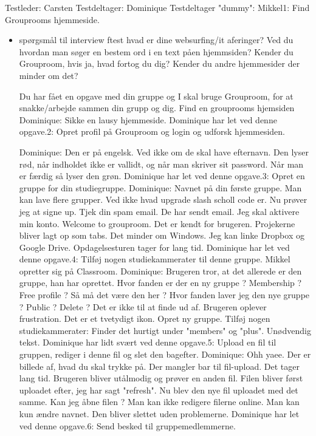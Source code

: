 \documentclass[12pt]{article}
\begin{document}
Testleder: Carsten
Testdeltager: Dominique
Testdeltager "dummy": Mikkel1: Find Grouprooms hjemmeside.

\begin{itemize} 
\item {sp\o rgsm\aa l til interview f\or test}
hvad er dine websurfing/it aferinger?
Ved du hvordan man s\o ger en bestem ord i en text p\aa  en hjemmsiden?
Kender du Grouproom, hvis ja, hvad fortog du dig?
Kender du andre hjemmesider der minder om det?
 

Du har f\aa et en opgave med din gruppe og I skal bruge Grouproom, for at snakke/arbejde sammen din grupp og dig. Find en grouprooms hjemsiden
Dominique: Sikke en lausy hjemmeside.
Dominique har let ved denne opgave.2: Opret profil på Grouproom og login og udforsk hjemmesiden.

Dominique: Den er på engelsk. Ved ikke om de skal have efternavn. Den lyser rød, når indholdet ikke er vallidt, og når man skriver sit password. Når man er færdig så lyser den grøn.
Dominique har let ved denne opgave.3: Opret en gruppe for din studiegruppe.
Dominique: Navnet på din første gruppe. Man kan lave flere grupper. Ved ikke hvad upgrade slash scholl code er.
Nu prøver jeg at signe up.
Tjek din spam email. De har sendt email.
Jeg skal aktivere min konto.
Welcome to grouproom.
Det er kendt for brugeren. Projekerne bliver lagt op som tabs. Det minder om Windows.
Jeg kan linke Dropbox og Google Drive.
Opdagelsesturen tager for lang tid.
Dominique har let ved denne opgave.4: Tilføj nogen studiekammerater til denne gruppe.
Mikkel opretter sig på Classroom.
Dominique: Brugeren tror, at det allerede er den gruppe, han har oprettet.
Hvor fanden er der en ny gruppe ?
Membership ? Free profile ? Så må det være den her ?
Hvor fanden laver jeg den nye gruppe ? Public ? Delete ?
Det er ikke til at finde ud af. Brugeren oplever frustration.
Det er et tvetydigt ikon. Opret ny gruppe.
Tilføj nogen studiekammerater: Finder det hurtigt under "members" og "plus". Unødvendig tekst.
Dominique har lidt svært ved denne opgave.5: Upload en fil til gruppen, rediger i denne fil og slet den bagefter.
Dominique: Ohh yaee. Der er billede af, hvad du skal trykke på. Der mangler bar til fil-upload. Det tager lang tid. Brugeren bliver utålmodig og prøver en anden fil.
Filen bliver først uploadet efter, jeg har sagt "refresh".
Nu blev den nye fil uploadet med det samme.
Kan jeg åbne filen ? Man kan ikke redigere filerne online. Man kan kun ændre navnet.
Den bliver slettet uden problemerne.
Dominique har let ved denne opgave.6: Send besked til gruppemedlemmerne.

\end{itemize}
\end{document}
